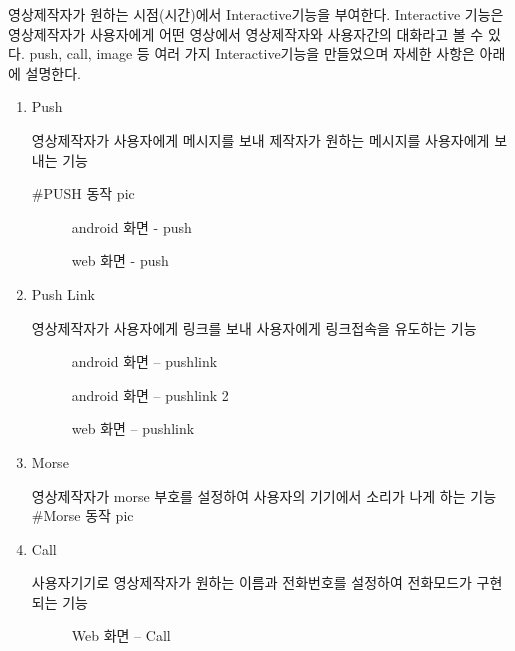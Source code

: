 \documentclass{oblivoir}
\begin{document}
영상제작자가 원하는 시점(시간)에서 Interactive기능을 부여한다. Interactive 기능은 영상제작자가 사용자에게 어떤 영상에서 영상제작자와 사용자간의 대화라고 볼 수 있다. push, call, image 등 여러 가지 Interactive기능을 만들었으며 자세한 사항은 아래에 설명한다.  

\begin{enumerate}
    
    \item  Push 

영상제작자가 사용자에게 메시지를 보내 제작자가 원하는 메시지를 사용자에게 보내는 기능

#PUSH 동작 pic

\begin{figure}[h!]
    \centering
    \caption{android 화면 - push}
\end{figure}
\begin{figure}[h!]
    \centering
    \caption{web 화면 - push}
\end{figure}

    \item  Push Link 

영상제작자가 사용자에게 링크를 보내 사용자에게 링크접속을 유도하는 기능

\begin{figure}[h!]
    \centering
    \caption{android 화면 – pushlink}
\end{figure}

\begin{figure}[h!]
    \centering
    \caption{android 화면 – pushlink 2}
\end{figure}

\begin{figure}[h!]
    \centering
    \caption{web 화면 – pushlink}
\end{figure}

    \item  Morse

영상제작자가 morse 부호를 설정하여 사용자의 기기에서 소리가 나게 하는 기능
#Morse 동작 pic

    \item  Call 

사용자기기로 영상제작자가 원하는 이름과 전화번호를 설정하여 전화모드가 구현되는 기능

\begin{figure}[h!]
    \centering
    \caption{Web 화면 – Call}
\end{figure}



\end{enumerate}
\end{document}

